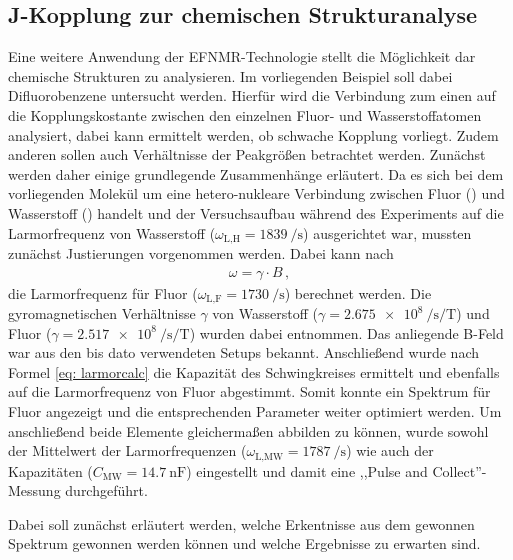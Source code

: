 \subsection{J-Kopplung zur chemischen Strukturanalyse}
Eine weitere Anwendung der EFNMR-Technologie stellt die Möglichkeit dar chemische Strukturen zu analysieren.
Im vorliegenden Beispiel soll dabei Difluorobenzene untersucht werden.
Hierfür wird die Verbindung zum einen auf die Kopplungskostante zwischen den einzelnen Fluor- und Wasserstoffatomen analysiert, dabei kann ermittelt werden, ob schwache Kopplung vorliegt.
Zudem anderen sollen auch Verhältnisse der Peakgrößen betrachtet werden.
Zunächst werden daher einige grundlegende Zusammenhänge erläutert.
Da es sich bei dem vorliegenden Molekül um eine hetero-nukleare Verbindung zwischen Fluor () und Wasserstoff () handelt und der Versuchsaufbau während des Experiments auf die Larmorfrequenz von Wasserstoff ($\omega_{\text{L,H}} = \SI{1839}{\per \second}$) ausgerichtet war, mussten zunächst Justierungen vorgenommen werden.
Dabei kann nach
\begin{align}
    \omega = \gamma \cdot B \, , \label{eq: LarmorB}    
\end{align}
die Larmorfrequenz für Fluor ($\omega_{\text{L,F}} = \SI{1730}{\per \second}$) berechnet werden. 
Die gyromagnetischen Verhältnisse $\gamma$ von Wasserstoff ($\gamma = \SI{2.675 e8}{\per \second \per \tesla}$) und Fluor ($\gamma = \SI{2.517 e8}{\per \second \per \tesla}$) wurden dabei \cite{Schmidt} entnommen. 
Das anliegende B-Feld war aus den bis dato verwendeten Setups bekannt.
Anschließend wurde nach Formel \eqref{eq: larmorcalc} die Kapazität des Schwingkreises ermittelt und ebenfalls auf die Larmorfrequenz von Fluor abgestimmt.
Somit konnte ein Spektrum für Fluor angezeigt und die entsprechenden Parameter weiter optimiert werden.
Um anschließend beide Elemente gleichermaßen abbilden zu können, wurde sowohl der Mittelwert der Larmorfrequenzen ($\omega_{\text{L,MW}} = \SI{1787}{\per \second}$) wie auch der Kapazitäten ($C_{\text{MW}} = \SI{14.7}{\nano \farad}$) eingestellt und damit eine ,,Pulse and Collect''-Messung durchgeführt.

Dabei soll zunächst erläutert werden, welche Erkentnisse aus dem gewonnen Spektrum gewonnen werden können und welche Ergebnisse zu erwarten sind.


